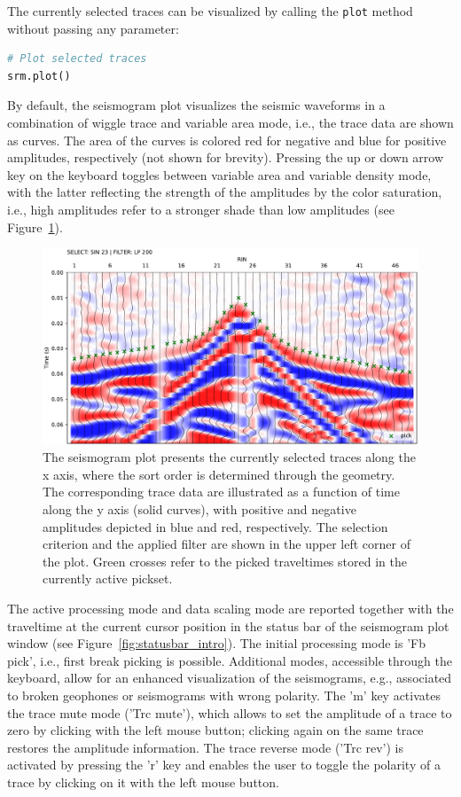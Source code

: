 \documentclass[a4paper,fleqn]{cas-sc}
\begin{document}
The currently selected traces can be visualized by calling the \texttt{plot} method without passing any parameter:
\begin{lstlisting}[language=Python, firstnumber=18]
# Plot selected traces
srm.plot()
\end{lstlisting}
By default, the seismogram plot visualizes the seismic waveforms in a combination of wiggle trace and variable area mode, i.e., the trace data are shown as curves. The area of the curves is colored red for negative and blue for positive amplitudes, respectively (not shown for brevity). Pressing the up or down arrow key on the keyboard toggles between variable area and variable density mode, with the latter reflecting the strength of the amplitudes by the color saturation, i.e., high amplitudes refer to a stronger shade than low amplitudes (see Figure~\ref{fig:srm_intro}).
\begin{figure}
	\centering
	\includegraphics[width=.75\textwidth]{figures/srm_intro.pdf}
	\caption{The seismogram plot presents the currently selected traces along the x axis, where the sort order is determined through the geometry. The corresponding trace data are illustrated as a function of time along the y axis (solid curves), with positive and negative amplitudes depicted in blue and red, respectively. The selection criterion and the applied filter are shown in the upper left corner of the plot. Green crosses refer to the picked traveltimes stored in the currently active pickset.}
	\label{fig:srm_intro}
\end{figure}
The active processing mode and data scaling mode are reported together with the traveltime at the current cursor position in the status bar of the seismogram plot window (see Figure~\ref{fig:statusbar_intro}).
The initial processing mode is 'Fb pick', i.e., first break picking is possible. Additional modes, accessible through the keyboard, allow for an enhanced visualization of the seismograms, e.g., associated to broken geophones or seismograms with wrong polarity. 
The 'm' key activates the trace mute mode ('Trc mute'), which allows to set the amplitude of a trace to zero by clicking with the left mouse button; clicking again on the same trace restores the amplitude information. The trace reverse mode ('Trc rev') is activated by pressing the 'r' key and enables the user to toggle the polarity of a trace by clicking on it with the left mouse button. 
\end{document}
